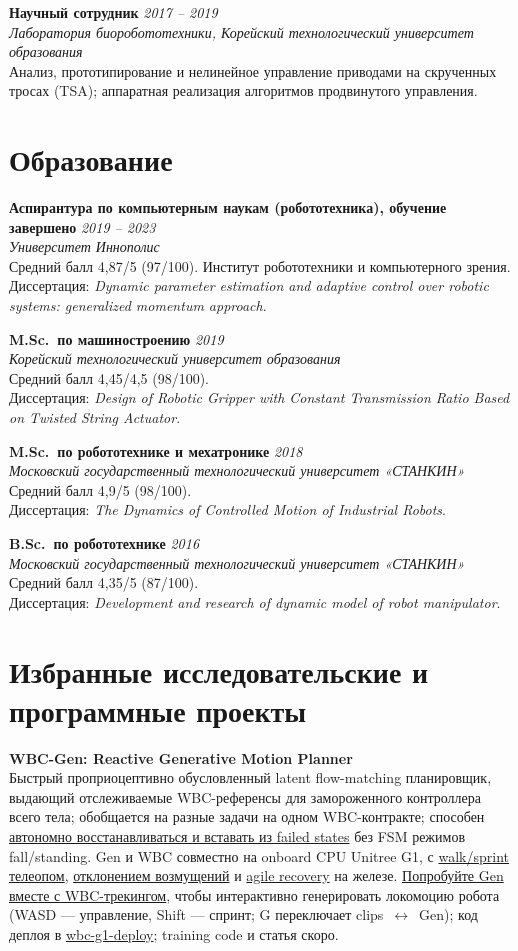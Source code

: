 \documentclass[11pt,a4paper]{article}
\newcommand{\cventry}[4]{%
  \textbf{#1} \hfill \textit{#2}\\
  \textit{#3}\\
  #4\par\vspace{0.25em}
}
\begin{document}
\cventry{Научный сотрудник}{2017 -- 2019}{Лаборатория биоробототехники, Корейский технологический университет образования}{%
  Анализ, прототипирование и нелинейное управление приводами на скрученных тросах (TSA); аппаратная реализация алгоритмов продвинутого управления.}

\section{Образование}

\cventry{Аспирантура по компьютерным наукам (робототехника), обучение завершено}{2019 -- 2023}{Университет Иннополис}{Средний балл 4{,}87/5 (97/100). Институт робототехники и компьютерного зрения.\\
Диссертация: \emph{Dynamic parameter estimation and adaptive control over robotic systems: generalized momentum approach}.}

\cventry{M.Sc.\ по машиностроению}{2019}{Корейский технологический университет образования}{Средний балл 4{,}45/4{,}5 (98/100).\\
Диссертация: \emph{Design of Robotic Gripper with Constant Transmission Ratio Based on Twisted String Actuator}.}

\cventry{M.Sc.\ по робототехнике и мехатронике}{2018}{Московский государственный технологический университет «СТАНКИН»}{Средний балл 4{,}9/5 (98/100).\\
Диссертация: \emph{The Dynamics of Controlled Motion of Industrial Robots}.}

\cventry{B.Sc.\ по робототехнике}{2016}{Московский государственный технологический университет «СТАНКИН»}{Средний балл 4{,}35/5 (87/100).\\
Диссертация: \emph{Development and research of dynamic model of robot manipulator}.}

\section{Избранные исследовательские и программные проекты}

\textbf{WBC-Gen: Reactive Generative Motion Planner}\\
Быстрый проприоцептивно обусловленный latent flow-matching планировщик, выдающий отслеживаемые WBC-референсы для замороженного контроллера всего тела; обобщается на разные задачи на одном WBC-контракте; способен \href{https://youtu.be/gAHCAtJnRDU}{автономно восстанавливаться и вставать из failed states} без FSM режимов fall/standing. Gen и WBC совместно на onboard CPU Unitree G1, с \href{https://youtube.com/shorts/dXNI8benYAo}{walk/sprint телеопом}, \href{https://youtube.com/shorts/iofTKa0GPwQ}{отклонением возмущений} и \href{https://youtube.com/shorts/aMezmX262tg}{agile recovery} на железе. \href{https://wbc-mjlab.github.io/wbc-demo/}{Попробуйте Gen вместе с WBC-трекингом}, чтобы интерактивно генерировать локомоцию робота (WASD — управление, Shift — спринт; G переключает clips~$\leftrightarrow$~Gen); код деплоя в \href{https://github.com/wbc-mjlab/wbc-g1-deploy/tree/feat/generator}{wbc-g1-deploy}; training code и статья скоро.
\end{document}
